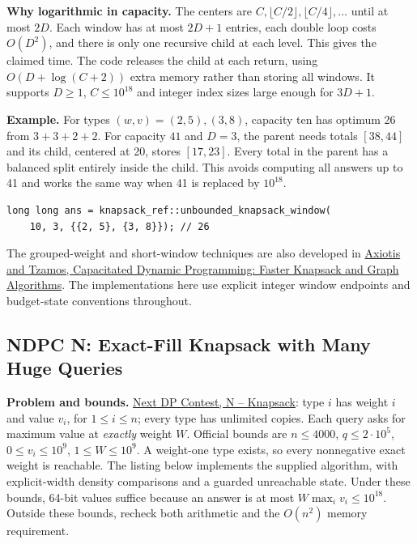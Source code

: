 \textbf{Why logarithmic in capacity.} The centers are
$C,\lfloor C/2\rfloor,\lfloor C/4\rfloor,\ldots$ until at most $2D$.
Each window has at most $2D+1$ entries, each double loop costs
$O(D^2)$, and there is only one recursive child at each level.
This gives the claimed time. The code releases the child at each
return, using $O(D+\log(C+2))$ extra memory rather than storing
all windows. It supports $D\ge1$, $C\le10^{18}$ and integer index
sizes large enough for $3D+1$.

\textbf{Example.} For types $(w,v)=(2,5),(3,8)$, capacity ten has
optimum 26 from $3+3+2+2$. For capacity $41$ and $D=3$, the parent
needs totals $[38,44]$ and its child, centered at 20, stores
$[17,23]$. Every total in the parent has a balanced split entirely
inside the child. This avoids computing all answers up to 41 and
works the same way when 41 is replaced by $10^{18}$.

\begin{minipage}{\linewidth}
\begin{lstlisting}[style=C++,showstringspaces=false]
long long ans = knapsack_ref::unbounded_knapsack_window(
    10, 3, {{2, 5}, {3, 8}}); // 26
\end{lstlisting}
\end{minipage}
\par
The grouped-weight and short-window techniques are also developed in
\href{https://arxiv.org/abs/1802.06440}{Axiotis and Tzamos,
Capacitated Dynamic Programming: Faster Knapsack and Graph Algorithms}.
The implementations here use explicit integer window endpoints and
budget-state conventions throughout.

\subsection{NDPC N: Exact-Fill Knapsack with Many Huge Queries}
\label{sec:ndpc-knapsack}
\textbf{Problem and bounds.}
\href{https://atcoder.jp/contests/ndpc/tasks/ndpc2026_n}{Next DP
Contest, N -- Knapsack}: type $i$ has weight $i$ and value $v_i$,
for $1\le i\le n$; every type has unlimited copies. Each query asks
for maximum value at \emph{exactly} weight $W$.
Official bounds are $n\le4000$, $q\le2\cdot10^5$,
$0\le v_i\le10^9$, $1\le W\le10^9$.
A weight-one type exists, so every nonnegative exact weight is
reachable. The listing below implements the supplied algorithm,
with explicit-width density comparisons and a guarded unreachable
state. Under these bounds, 64-bit values suffice because an answer
is at most $W\max_i v_i\le10^{18}$. Outside these bounds, recheck
both arithmetic and the $O(n^2)$ memory requirement.

